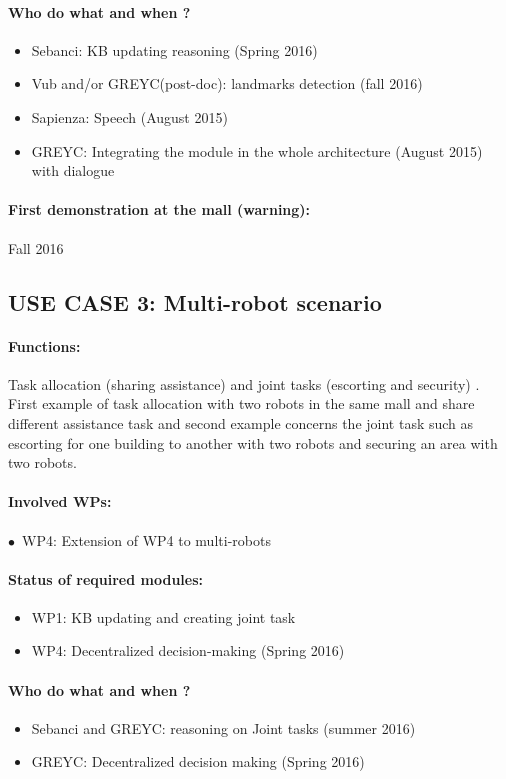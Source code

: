 \documentclass{article}
\begin{document}
\paragraph{\bf  Who do what and when ?}
\begin{itemize} 
\item Sebanci: KB updating reasoning (Spring 2016)
\item Vub and/or GREYC(post-doc): landmarks detection (fall 2016)
\item Sapienza: Speech (August 2015)
\item GREYC: Integrating the module in the whole architecture (August 2015) with dialogue
\end{itemize}
\paragraph{\bf First demonstration at the mall (warning):} Fall 2016
\subsection{USE CASE 3:  Multi-robot scenario}
\paragraph{\bf Functions:} Task allocation (sharing assistance) and joint tasks (escorting and security) . First example of task allocation with two robots in the same mall and share different assistance task and second example concerns the joint task such as escorting for one building to another with two robots and securing an area with two robots. 
\paragraph{\bf Involved WPs:}
$\bullet$~WP4: Extension of WP4 to multi-robots
\paragraph{\bf Status of required modules:}
\begin{itemize} 
\item WP1: KB updating and creating joint task
\item WP4: Decentralized decision-making (Spring 2016)
\end{itemize}
\paragraph{\bf Who do what and when ?}
\begin{itemize} 
\item Sebanci and GREYC: reasoning on Joint tasks (summer 2016)
\item GREYC: Decentralized decision making (Spring 2016)
\end{itemize}
\end{document}
